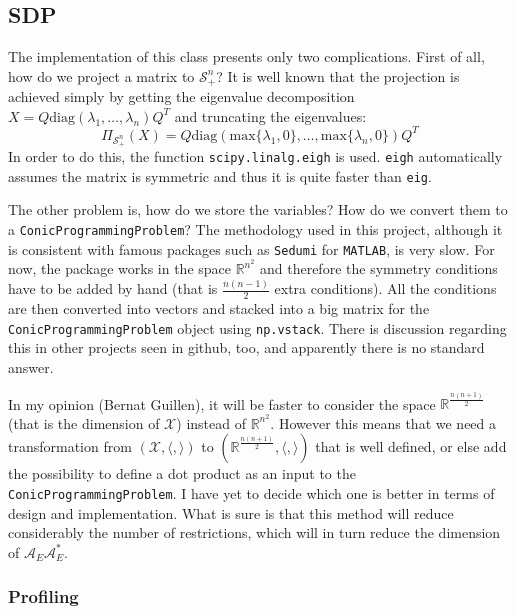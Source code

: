\documentclass[paper=a4, fontsize=11pt]{scrartcl}
\numberwithin{equation}{section}		%
\numberwithin{figure}{section}			%
\numberwithin{table}{section}				%
\begin{document}
\subsection{SDP\label{sec:SDP}}
The implementation of this class presents only two complications. First of all, how do we project a matrix to $\mathcal{S}^n_+$? It is well known that the projection is achieved simply by getting the eigenvalue decomposition $X = Q\text{diag}(\lambda_1,\dots,\lambda_n)Q^T$ and truncating the eigenvalues:
\begin{equation}
\Pi_{\mathcal{S}^n_+}(X) = Q\text{diag}(\text{max}\{\lambda_1,0\},\dots,\text{max}\{\lambda_n,0\})Q^T
\end{equation}
In order to do this, the function \texttt{scipy.linalg.eigh} is used. \texttt{eigh} automatically assumes the matrix is symmetric and thus it is quite faster than \texttt{eig}.

The other problem is, how do we store the variables? How do we convert them to a \texttt{ConicProgrammingProblem}? The methodology used in this project, although it is consistent with famous packages such as \texttt{Sedumi} for \texttt{MATLAB}, is very slow. For now, the package works in the space $\mathbb{R}^{n^2}$ and therefore the symmetry conditions have to be added by hand (that is $\frac{n(n-1)}{2}$ extra conditions). All the conditions are then converted into vectors and stacked into a big matrix for the \texttt{ConicProgrammingProblem} object using \texttt{np.vstack}. There is discussion regarding this in other projects \cite{gitsym} seen in github, too, and apparently there is no standard answer. 

In my opinion (Bernat Guillen), it will be faster to consider the space $\mathbb{R}^{\frac{n(n+1)}{2}}$ (that is the dimension of $\mathcal{X}$) instead of $\mathbb{R}^{n^2}$. However this means that we need a transformation from $(\mathcal{X},\langle,\rangle)$ to $(\mathbb{R}^{\frac{n(n+1)}{2}},\langle,\rangle)$ that is well defined, or else add the possibility to define a dot product as an input to the  \texttt{ConicProgrammingProblem}. I have yet to decide which one is better in terms of design and implementation. What is sure is that this method will reduce considerably the number of restrictions, which will in turn reduce the dimension of $\mathcal{A}_E\mathcal{A}_E^*$.

\subsubsection{Profiling}
\end{document}
